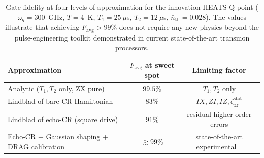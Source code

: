 \begin{table}[htbp]
\centering
\begin{tabular}{lcc}
\toprule
Approximation & $F_{\text{avg}}$ at sweet spot & Limiting factor \\
\midrule
Analytic ($T_1, T_2$ only, ZX pure)            & $99.5\%$ & $T_1, T_2$ only \\
Lindblad of bare CR Hamiltonian                & $83\%$   & $IX, ZI, IZ, \zeta_{zz}^{\text{stat}}$ \\
Lindblad of echo-CR (square drive)             & $91\%$   & residual higher-order errors \\
Echo-CR + Gaussian shaping + DRAG calibration  & $\gtrsim 99\%$
                                                   & state-of-the-art experimental
                                                     ~\cite{Sheldon2016}\\
\bottomrule
\end{tabular}
\caption{Gate fidelity at four levels of approximation for the innovation
HEATS-Q point ($\omega_q\!=\!300$~GHz, $T\!=\!4$~K, $T_1\!=\!25~\mu$s,
$T_2\!=\!12~\mu$s, $\bar{n}_{\text{th}}\!=\!0.028$). The values illustrate
that achieving $F_{\text{avg}}>99\%$ does not require any new physics
beyond the pulse-engineering toolkit demonstrated in current
state-of-the-art transmon processors.}
\label{tab:fidelity_budget}
\end{table}
